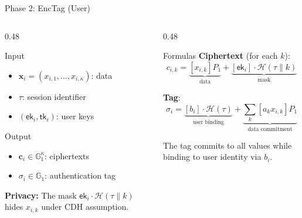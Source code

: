\documentclass[aspectratio=169,10pt]{beamer}
\newcommand{\G}{\mathbb{G}}
\newcommand{\Hash}{\mathcal{H}}
\begin{document}
\begin{frame}{Phase 2: EncTag (User)}
    \begin{columns}[T]
        \begin{column}{0.48\textwidth}
            \begin{alertblock}{Input}
                \begin{itemize}
                    \item $\mathbf{x}_i = (x_{i,1}, \ldots, x_{i,\kappa})$: data
                    \item $\tau$: session identifier
                    \item $(\mathsf{ek}_i, \mathsf{tk}_i)$: user keys
                \end{itemize}
            \end{alertblock}

            \begin{exampleblock}{Output}
                \begin{itemize}
                    \item $\mathbf{c}_i \in \G_1^\kappa$: ciphertexts
                    \item $\sigma_i \in \G_1$: authentication tag
                \end{itemize}
            \end{exampleblock}

            \vspace{0.3em}
            \textbf{Privacy:} The mask $\mathsf{ek}_i \cdot \Hash(\tau\|k)$ hides $x_{i,k}$ under CDH assumption.
        \end{column}
        \begin{column}{0.48\textwidth}
            \begin{block}{Formulas}
                \textbf{Ciphertext} (for each $k$):
                \[
                c_{i,k} = \underbrace{[x_{i,k}] P_1}_{\text{data}} + \underbrace{[\mathsf{ek}_i] \cdot \Hash(\tau \| k)}_{\text{mask}}
                \]

                \vspace{0.3em}
                \textbf{Tag}:
                \[
                \sigma_i = \underbrace{[b_i] \cdot \Hash(\tau)}_{\text{user binding}} + \underbrace{\sum_{k} [a_k x_{i,k}] P_1}_{\text{data commitment}}
                \]
            \end{block}

            \vspace{0.2em}
            The tag commits to all values while binding to user identity via $b_i$.
        \end{column}
    \end{columns}
\end{frame}
\end{document}
